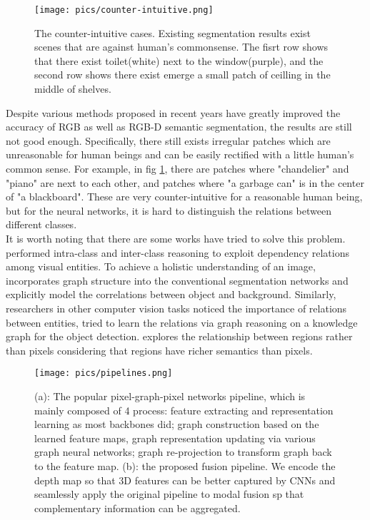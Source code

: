 \documentclass[journal]{IEEEtran}
\begin{document}
\begin{figure}
    \centering
    \texttt{[image: pics/counter-intuitive.png]}
    \caption{The counter-intuitive cases. Existing segmentation results exist scenes that are against human's commonsense. The fisrt row shows that there exist toilet(white) next to the window(purple), and the second row shows there exist emerge a small patch of ceilling in the middle of shelves. }
    \label{fig_counter_intuitive}
\end{figure}

 
    Despite various methods proposed in recent years have greatly improved the accuracy of RGB as well as RGB-D semantic segmentation, the results are still not good enough. Specifically, there still exists irregular patches which are unreasonable for human beings and can be easily rectified with a little human's common sense. For example, in fig \ref{fig_counter_intuitive}, there are patches where "chandelier" and "piano" are next to each other, and patches where "a garbage can" is in the center of "a blackboard". These are very counter-intuitive for a reasonable human being, but for the neural networks, it is hard to distinguish the relations between different classes.\\   

 
    It is worth noting that there are some works have tried to solve this problem. \cite{liu2021exploit} performed intra-class and inter-class reasoning to exploit dependency relations among visual entities. To achieve a holistic understanding of an image, \cite{wu2020bidirectional} incorporates graph structure into the conventional segmentation networks and explicitly model the correlations between object and background. Similarly, researchers in other computer vision tasks noticed the importance of relations between entities, \cite{zhou2021relation} tried to learn the relations via graph reasoning on a knowledge graph for the object detection. \cite{wang2020region} explores the relationship between regions rather than pixels considering that regions have richer semantics than pixels. \\   
    
\begin{figure}
    \centering
    \texttt{[image: pics/pipelines.png]}
    \caption{(a): The popular pixel-graph-pixel networks pipeline, which is mainly composed of 4 process:  feature extracting and representation learning as most backbones did; graph construction based on the learned feature maps, graph representation updating via various graph neural networks; graph re-projection to transform graph back to the feature map. (b): the proposed fusion pipeline. We encode the depth map so that 3D features can be better captured by CNNs and seamlessly apply the original pipeline to modal fusion sp that complementary information can be aggregated.}
    \label{fig_pipeline}
\end{figure}
\end{document}
